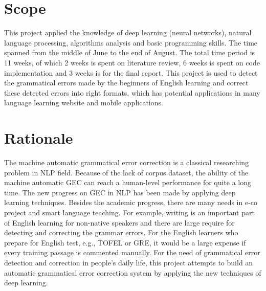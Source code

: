 \section{Scope}

This project applied the knowledge of deep learning (neural networks), natural language processing, algorithms analysis and basic programming skills. The time spanned from the middle of June to the end of August. The total time period is 11 weeks, of which 2 weeks is spent on literature review, 6 weeks is spent on code implementation and 3 weeks is for the final report. This project is used to detect the grammatical errors made by the beginners of English learning and correct these detected errors into right formats, which has potential applications in many language learning website and mobile applications.

\section{Rationale}
The machine automatic grammatical error correction is a classical researching problem in NLP field. Because of the lack of corpus dataset, the ability of the machine automatic GEC can reach a human-level performance for quite a long time. The new progress on GEC in NLP has been made by applying deep learning techniques. Besides the academic progress, there are many needs in e-co project and smart language teaching. For example, writing is an important part of English learning for non-native speakers and there are large require for detecting and correcting the grammar errors. For the English learners who prepare for English test, e.g., TOFEL or GRE, it would be a large expense if every training passage is commented manually. For the need of grammatical error detection and correction in people’s daily life, this project attempts to build an automatic grammatical error correction system by applying the new techniques of deep learning.

